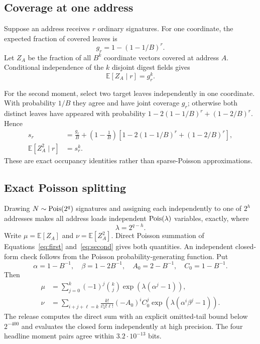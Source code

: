 \documentclass[11pt,a4paper]{article}
\newcommand{\E}{\mathbb E}
\newcommand{\Pois}{\mathop{\rm Pois}}
\begin{document}
\subsection{Coverage at one address}

Suppose an address receives $r$ ordinary signatures.  For one coordinate, the
expected fraction of covered leaves is
\begin{equation}
 g_r=1-(1-1/B)^r.                                      \label{eq:g}
\end{equation}
Let $Z_A$ be the fraction of all $B^k$ coordinate vectors covered at address
$A$.  Conditional independence of the $k$ disjoint digest fields gives
\begin{equation}
 \E[Z_A\mid r]=g_r^k.                                  \label{eq:first}
\end{equation}

For the second moment, select two target leaves independently in one
coordinate.  With probability $1/B$ they agree and have joint coverage
$g_r$; otherwise both distinct leaves have appeared with probability
$1-2(1-1/B)^r+(1-2/B)^r$.  Hence
\begin{align}
 s_r&=\frac{g_r}{B}+\left(1-\frac1B\right)
   \left[1-2(1-1/B)^r+(1-2/B)^r\right],                \label{eq:s}\\
 \E[Z_A^2\mid r]&=s_r^k.                               \label{eq:second}
\end{align}
These are exact occupancy identities rather than sparse-Poisson
approximations.

\subsection{Exact Poisson splitting}

Drawing $N\sim\Pois(2^q)$ signatures and assigning each independently to one
of $2^h$ addresses makes all address loads independent
$\Pois(\lambda)$ variables, exactly, where
\begin{equation}
                         \lambda=2^{q-h}.               \label{eq:lambda}
\end{equation}
Write $\mu=\E[Z_A]$ and $\nu=\E[Z_A^2]$.  Direct Poisson summation of
Equations~\eqref{eq:first} and~\eqref{eq:second} gives both quantities.  An
independent closed-form check follows from the Poisson probability-generating
function.  Put
\[
 \alpha=1-B^{-1},\quad \beta=1-2B^{-1},\quad
 A_0=2-B^{-1},\quad C_0=1-B^{-1}.
\]
Then
\begin{align}
 \mu&=\sum_{j=0}^{k}(-1)^j \binom{k}{j}
      \exp\!\left(\lambda(\alpha^j-1)\right),            \label{eq:muclosed}\\
 \nu&=\sum_{i+j+\ell=k}\frac{k!}{i!j!\ell!}
      (-A_0)^i C_0^j
      \exp\!\left(\lambda(\alpha^i\beta^j-1)\right).    \label{eq:nuclosed}
\end{align}
The release computes the direct sum with an explicit omitted-tail bound below
$2^{-400}$ and evaluates the closed form independently at high precision.  The
four headline moment pairs agree within $3.2\cdot10^{-13}$ bits.
\end{document}
